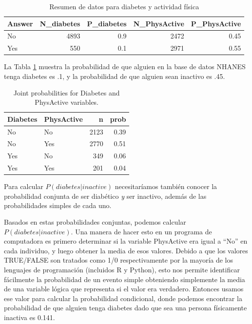 \documentclass[
  12pt,
]{book}
\theoremstyle{definition}
\theoremstyle{definition}
\theoremstyle{definition}
\theoremstyle{remark}
\begin{document}
\begin{table}

\caption{\label{tab:DiabetesPhysActiveSummary}Resumen de datos para diabetes y actividad física}
\centering
\begin{tabular}[t]{l|r|r|r|r}
\hline
Answer & N\_diabetes & P\_diabetes & N\_PhysActive & P\_PhysActive\\
\hline
No & 4893 & 0.9 & 2472 & 0.45\\
\hline
Yes & 550 & 0.1 & 2971 & 0.55\\
\hline
\end{tabular}
\end{table}

La Tabla \ref{tab:DiabetesPhysActiveSummary} muestra la probabilidad de que alguien en la base de datos NHANES tenga diabetes es .1, y la probabilidad de que alguien sean inactivo es .45.

\begin{table}

\caption{\label{tab:DiabetesPhysActiveSummaryJoint}Joint probabilities for Diabetes and PhysActive variables.}
\centering
\begin{tabular}[t]{l|l|r|r}
\hline
Diabetes & PhysActive & n & prob\\
\hline
No & No & 2123 & 0.39\\
\hline
No & Yes & 2770 & 0.51\\
\hline
Yes & No & 349 & 0.06\\
\hline
Yes & Yes & 201 & 0.04\\
\hline
\end{tabular}
\end{table}

Para calcular \(P(diabetes|inactive)\) necesitaríamos también conocer la probabilidad conjunta de ser diabético \emph{y} ser inactivo, además de las probabilidades simples de cada uno.

Basados en estas probabilidades conjuntas, podemos calcular \(P(diabetes|inactive)\). Una manera de hacer esto en un programa de computadora es primero determinar si la variable PhysActive era igual a ``No'' en cada individuo, y luego obtener la media de esos valores. Debido a que los valores TRUE/FALSE son tratados como 1/0 respectivamente por la mayoría de los lenguajes de programación (incluidos R y Python), esto nos permite identificar fácilmente la probabilidad de un evento simple obteniendo simplemente la media de una variable lógica que representa si el valor era verdadero. Entonces usamos ese valor para calcular la probabilidad condicional, donde podemos encontrar la probabilidad de que alguien tenga diabetes dado que sea una persona físicamente inactiva es 0.141.
\end{document}
